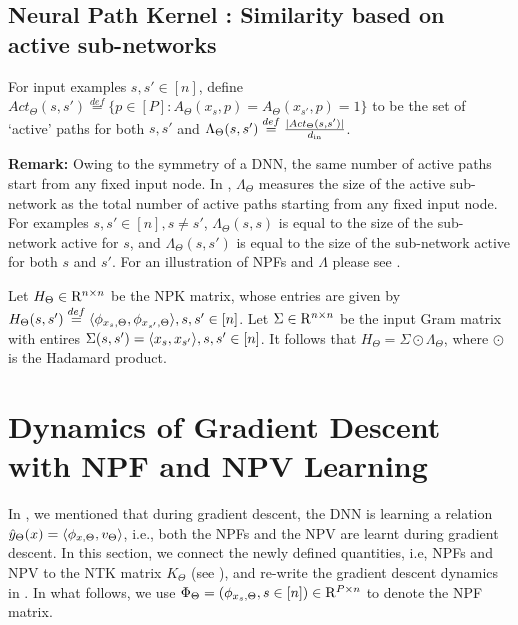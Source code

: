 \documentclass{article}
\begin{document}
\subsection{Neural Path Kernel : Similarity based on active sub-networks}
\begin{definition}\label{def:lambda}
 For input examples $s,s'\in[n]$, define $Act_{\Theta}(s,s')\stackrel{def}=\{p\in[P]\colon A_{\Theta}(x_s,p)= A_{\Theta}(x_{s'},p)=1\}$ to be the set of `active' paths for both $s,s'$  and $\Lambda_{\Theta}(s,s')\stackrel{def}=\frac{|Act_{\Theta}(s,s')|}{d_{\text{in}}}$.
\end{definition}
\textbf{Remark:} Owing to the symmetry of a DNN, the same number of active paths start from any fixed input node. In , $\Lambda_{\Theta}$ measures the size of the active sub-network as the total number of active paths starting from any fixed input node. For examples $s,s'\in[n],s\neq s'$, $\Lambda_{\Theta}(s,s)$ is equal to the size of the sub-network active for $s$, and $\Lambda_{\Theta}(s,s')$ is equal to the size of the sub-network active for both $s$ and $s'$. For an illustration of NPFs and $\Lambda$ please see .
\begin{lemma}\label{lm:npk}
Let $H_{\Theta}\in\mathrm{R}^{n\times n}$ be the NPK matrix, whose entries are given by $H_{\Theta}(s,s')\stackrel{def}{=}\langle \phi_{x_s,\Theta},\phi_{x_{s'},\Theta}\rangle,s,s'\in[n]$. Let $\Sigma\in\mathrm{R}^{n\times n}$ be the input Gram matrix with entires $\Sigma(s,s')=\langle x_s,x_{s'}\rangle,s,s'\in[n]$. It follows that $H_{\Theta}= \Sigma\odot\Lambda_{\Theta}$, where $\odot$ is  the Hadamard product.
\end{lemma}

\section{Dynamics of Gradient Descent with NPF and NPV Learning}\label{sec:gatedyna}
In , we mentioned that during gradient descent, the DNN is learning a relation $\hat{y}_{\Theta}(x)=\langle \phi_{x,\Theta}, v_{\Theta}\rangle$, i.e., both the NPFs and the NPV are learnt during gradient descent. In this section, we connect the newly defined quantities, i.e, NPFs and NPV to the NTK matrix $K_{\Theta}$ (see ), and re-write the gradient descent dynamics in . In what follows, we use $\Phi_{\Theta}=(\phi_{x_s,\Theta},s\in[n])\in\mathrm{R}^{P\times n}$ to denote the NPF matrix.
\end{document}
